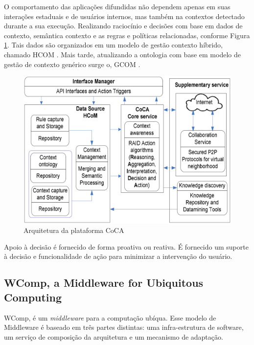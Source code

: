 \documentclass[12pt,a4paper,compsoc]{IEEEtran}
\begin{document}
  O comportamento das aplicações difundidas não dependem apenas em suas interações estaduais e de
  usuários internos, mas também na contextos detectado durante a sua execução. Realizando 
  raciocínio e decisões com base em dados de contexto, semântica contexto e as regras e políticas
  relacionadas, conforme Figura \ref{arquitetura-coca}. Tais dados são organizados em um modelo de
  gestão contexto híbrido, chamado HCOM \cite{ejigu2008hybrid}. Mais tarde, atualizando a ontologia
  com base em modelo de gestão de contexto genérico surge o, GCOM \cite{ejigu2008hybrid}.

  \begin{figure}[ht]
    \centerline{\includegraphics[scale=.2]{imagens/arquitetura-coca}}
    \caption{Arquitetura da plataforma CoCA \cite{ejigu2008hybrid}}
    \label{arquitetura-coca}
  \end{figure}
  
  Apoio à decisão é fornecido de forma proativa ou reativa. É fornecido um suporte à decisão e 
  funcionalidade de ação para minimizar a intervenção do usuário.


\subsection{WComp, a Middleware for Ubiquitous Computing}

  WComp, é um \textit{middleware} para a computação ubíqua. Esse modelo de Middleware é baseado em
  três partes distintas: uma infra-estrutura de software,  um serviço de composição da arquitetura e
  um mecanismo de adaptação.
  
\end{document}
